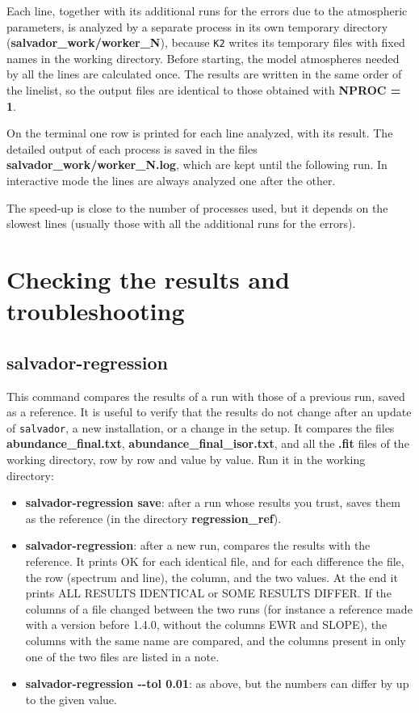 \documentclass[modern]{aastex701}
\begin{document}
Each line, together with its additional runs for the errors due to the atmospheric parameters, is analyzed by a separate process in its own temporary directory ({\bf salvador\_work/worker\_N}), because \texttt{K2} writes its temporary files with fixed names in the working directory. Before starting, the model atmospheres needed by all the lines are calculated once. The results are written in the same order of the linelist, so the output files are identical to those obtained with {\bf NPROC = 1}. 

On the terminal one row is printed for each line analyzed, with its result. The detailed output of each process is saved in the files {\bf salvador\_work/worker\_N.log}, which are kept until the following run. In interactive mode the lines are always analyzed one after the other. 

The speed-up is close to the number of processes used, but it depends on the slowest lines (usually those with all the additional runs for the errors).

\section{Checking the results and troubleshooting} \label{sect:tools}
\hrulefill

\subsection{salvador-regression}
This command compares the results of a run with those of a previous run, saved as a reference. It is useful to verify that the results do not change after an update of \texttt{salvador}, a new installation, or a change in the setup. It compares the files {\bf abundance\_final.txt}, {\bf abundance\_final\_isor.txt}, and all the {\bf .fit} files of the working directory, row by row and value by value. Run it in the working directory:
\begin{itemize}
    \item {\bf salvador-regression save}: after a run whose results you trust, saves them as the reference (in the directory {\bf regression\_ref}).
    \item {\bf salvador-regression}: after a new run, compares the results with the reference. It prints OK for each identical file, and for each difference the file, the row (spectrum and line), the column, and the two values. At the end it prints ALL RESULTS IDENTICAL or SOME RESULTS DIFFER. If the columns of a file changed between the two runs (for instance a reference made with a version before 1.4.0, without the columns EWR and SLOPE), the columns with the same name are compared, and the columns present in only one of the two files are listed in a note.
    \item {\bf salvador-regression -{}-tol 0.01}: as above, but the numbers can differ by up to the given value.
\end{itemize}
\end{document}
